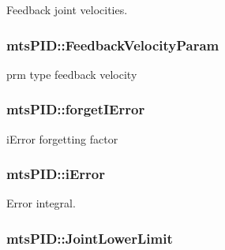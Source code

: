 Feedback joint velocities. 

\hypertarget{classmts_p_i_d_aeeab33b51fd3b843ac969d8e15ec0d8a}{}
\subsubsection[{Feedback\+Velocity\+Param}]{ mts\+P\+I\+D\+::\+Feedback\+Velocity\+Param\hspace{0.3cm}{\ttfamily [protected]}}\label{classmts_p_i_d_aeeab33b51fd3b843ac969d8e15ec0d8a}


prm type feedback velocity 

\hypertarget{classmts_p_i_d_a030332a1f4dead8460baeb6693c76195}{}
\subsubsection[{forget\+I\+Error}]{ mts\+P\+I\+D\+::forget\+I\+Error\hspace{0.3cm}{\ttfamily [protected]}}\label{classmts_p_i_d_a030332a1f4dead8460baeb6693c76195}


i\+Error forgetting factor 

\hypertarget{classmts_p_i_d_a89f471bbc0cb21cc9c64552a087c1a2c}{}
\subsubsection[{i\+Error}]{ mts\+P\+I\+D\+::i\+Error\hspace{0.3cm}{\ttfamily [protected]}}\label{classmts_p_i_d_a89f471bbc0cb21cc9c64552a087c1a2c}


Error integral. 

\hypertarget{classmts_p_i_d_a4156fdfac35c3175ad1731dbcdcba8f2}{}
\subsubsection[{Joint\+Lower\+Limit}]{ mts\+P\+I\+D\+::\+Joint\+Lower\+Limit\hspace{0.3cm}{\ttfamily [protected]}}\label{classmts_p_i_d_a4156fdfac35c3175ad1731dbcdcba8f2}


